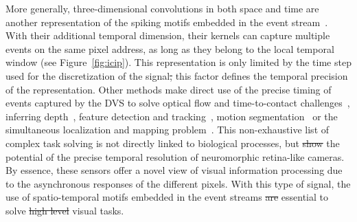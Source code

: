 \documentclass[brainsci, %
               review,accept,pdftex,moreauthors %
               ]{Definitions/mdpi}
\providecommand{\DIFadd}[1]{{\protect\color{blue}\uwave{#1}}} %
\providecommand{\DIFdel}[1]{{\protect\color{red}\sout{#1}}}                      %
\providecommand{\DIFaddbegin}{} %
\providecommand{\DIFaddend}{} %
\providecommand{\DIFdelbegin}{} %
\providecommand{\DIFdelend}{} %
\newcommand{\DIFscaledelfig}{0.5}
\newlength{\DIFdelgraphicswidth} %
\newlength{\DIFdelgraphicsheight} %
\newcommand{\DIFaddincludegraphics}[2][]{{\color{blue}\fbox{\DIFOincludegraphics[#1]{#2}}}} %
\newcommand{\DIFdelincludegraphics}[2][]{%
\sbox{\DIFdelgraphicsbox}{\DIFOincludegraphics[#1]{#2}}%
\settoboxwidth{\DIFdelgraphicswidth}{\DIFdelgraphicsbox} %
\settoboxtotalheight{\DIFdelgraphicsheight}{\DIFdelgraphicsbox} %
\scalebox{\DIFscaledelfig}{%
\parbox[b]{\DIFdelgraphicswidth}{\usebox{\DIFdelgraphicsbox}\\[-\baselineskip] \rule{\DIFdelgraphicswidth}{0em}}\llap{\resizebox{\DIFdelgraphicswidth}{\DIFdelgraphicsheight}{%
\setlength{\unitlength}{\DIFdelgraphicswidth}%
\begin{picture}(1,1)%
\thicklines\linethickness{2pt} %
{\color[rgb]{1,0,0}\put(0,0){\framebox(1,1){}}}%
{\color[rgb]{1,0,0}\put(0,0){\line( 1,1){1}}}%
{\color[rgb]{1,0,0}\put(0,1){\line(1,-1){1}}}%
\end{picture}%
}\hspace*{3pt}}} %
} %
\DeclareRobustCommand{\DIFaddbegin}{\DIFOaddbegin \let\includegraphics\DIFaddincludegraphics} %
\DeclareRobustCommand{\DIFaddend}{\DIFOaddend \let\includegraphics\DIFOincludegraphics} %
\DeclareRobustCommand{\DIFdelbegin}{\DIFOdelbegin \let\includegraphics\DIFdelincludegraphics} %
\DeclareRobustCommand{\DIFdelend}{\DIFOaddend \let\includegraphics\DIFOincludegraphics} %
\begin{document}
More generally, three-dimensional convolutions in both space and time are another representation of the spiking motifs embedded in the event stream~\citep{ghosh_spatiotemporal_2019, grimaldi_learning_2022, yu_stsc-snn_2022}. With their additional temporal dimension, their kernels can capture multiple events on the same pixel address, as long as they belong to the local temporal window (see Figure~\ref{fig:icip}). This representation is only limited by the time step used for the discretization of the signal\DIFdelbegin \DIFdel{, }\DIFdelend \DIFaddbegin \DIFadd{; }\DIFaddend this factor defines the temporal precision of the representation. Other methods make direct use of the precise timing of events captured by the DVS to solve optical flow and time-to-contact challenges~\citep{benosman_event-based_2014, clady_asynchronous_2014, tschechne_bio-inspired_2014}, inferring depth~\citep{hidalgo-carrio_learning_2020}, feature detection and tracking~\citep{dardelet_event-by-event_2021}, motion segmentation~\citep{stoffregen_event-based_2019} or the simultaneous localization and mapping problem~\citep{kim_real-time_2016}. This non-exhaustive list of complex task solving is not directly linked to biological processes, but \DIFdelbegin \DIFdel{show }\DIFdelend \DIFaddbegin \DIFadd{shows }\DIFaddend the potential of the precise temporal resolution of neuromorphic retina-like cameras. By essence, these sensors offer a novel view of visual information processing due to the asynchronous responses of the different pixels. With this type of signal, the use of spatio-temporal motifs embedded in the event streams \DIFdelbegin \DIFdel{are }\DIFdelend \DIFaddbegin \DIFadd{is }\DIFaddend essential to solve \DIFdelbegin \DIFdel{high level }\DIFdelend \DIFaddbegin \DIFadd{high-level }\DIFaddend visual tasks. 
\end{document}
